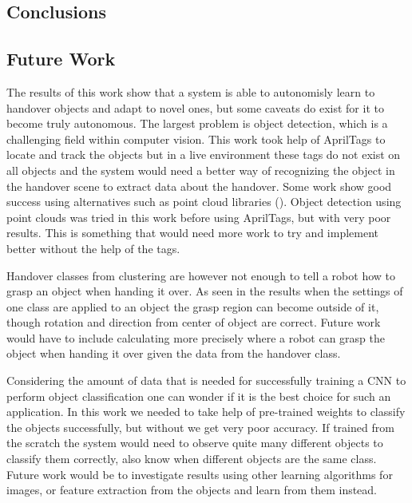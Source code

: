 \subsection{Conclusions}


\subsection{Future Work}

The results of this work show that a system is able to autonomisly learn to handover objects and adapt to novel ones, but some caveats do exist for it to become truly autonomous. The largest problem is object detection, which is a challenging field within computer vision. This work took help of AprilTags to locate and track the objects but in a live environment these tags do not exist on all objects and the system would need a better way of recognizing the object in the handover scene to extract data about the handover. Some work show good success using alternatives such as point cloud libraries (\parencite{Chan2015a}). Object detection using point clouds was tried in this work before using AprilTags, but with very poor results. This is something that would need more work to try and implement better without the help of the tags.

Handover classes from clustering are however not enough to tell a robot how to grasp an object when handing it over. As seen in the results when the settings of one class are applied to an object the grasp region can become outside of it, though rotation and direction from center of object are correct. Future work would have to include calculating more precisely where a robot can grasp the object when handing it over given the data from the handover class.

Considering the amount of data that is needed for successfully training a CNN to perform object classification one can wonder if it is the best choice for such an application. In this work we needed to take help of pre-trained weights to classify the objects successfully, but without we get very poor accuracy. If trained from the scratch the system would need to observe quite many different objects to classify them correctly, also know when different objects are the same class. Future work would be to investigate results using other learning algorithms for images, or feature extraction from the objects and learn from them instead.
